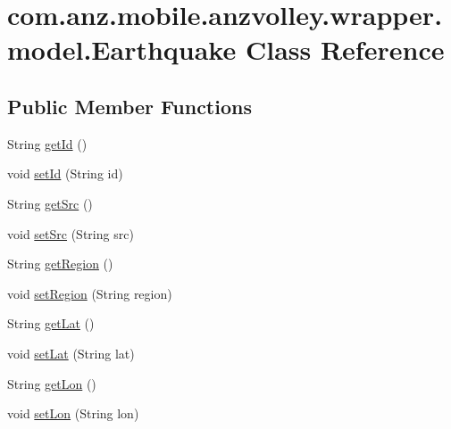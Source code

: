 \hypertarget{classcom_1_1anz_1_1mobile_1_1anzvolley_1_1wrapper_1_1model_1_1_earthquake}{\section{com.\+anz.\+mobile.\+anzvolley.\+wrapper.\+model.\+Earthquake Class Reference}
\label{classcom_1_1anz_1_1mobile_1_1anzvolley_1_1wrapper_1_1model_1_1_earthquake}
}
\subsection*{Public Member Functions}
\begin{DoxyCompactItemize}
\item 
String \hyperlink{classcom_1_1anz_1_1mobile_1_1anzvolley_1_1wrapper_1_1model_1_1_earthquake_a2e4d5762b4fcac4e0c1945888982351a}{get\+Id} ()
\item 
void \hyperlink{classcom_1_1anz_1_1mobile_1_1anzvolley_1_1wrapper_1_1model_1_1_earthquake_a0173d1f987db8e96e624944ee76c11d2}{set\+Id} (String id)
\item 
String \hyperlink{classcom_1_1anz_1_1mobile_1_1anzvolley_1_1wrapper_1_1model_1_1_earthquake_a0c26f0aff05cbf3cff20df12f36b41de}{get\+Src} ()
\item 
void \hyperlink{classcom_1_1anz_1_1mobile_1_1anzvolley_1_1wrapper_1_1model_1_1_earthquake_af5fdf187762e88241ad24a1d74c346c3}{set\+Src} (String src)
\item 
String \hyperlink{classcom_1_1anz_1_1mobile_1_1anzvolley_1_1wrapper_1_1model_1_1_earthquake_ae5996d2d68a066a085799f7d8c313bc0}{get\+Region} ()
\item 
void \hyperlink{classcom_1_1anz_1_1mobile_1_1anzvolley_1_1wrapper_1_1model_1_1_earthquake_a27897eb8ea61cfc4632ff3688fa2c09e}{set\+Region} (String region)
\item 
String \hyperlink{classcom_1_1anz_1_1mobile_1_1anzvolley_1_1wrapper_1_1model_1_1_earthquake_a4299268670e61659e546e8a0fa03abc9}{get\+Lat} ()
\item 
void \hyperlink{classcom_1_1anz_1_1mobile_1_1anzvolley_1_1wrapper_1_1model_1_1_earthquake_a0f9e775fe468e4bd24abdb79bf5679d4}{set\+Lat} (String lat)
\item 
String \hyperlink{classcom_1_1anz_1_1mobile_1_1anzvolley_1_1wrapper_1_1model_1_1_earthquake_a21648731ee91f6728bfc3a8dff86d223}{get\+Lon} ()
\item 
void \hyperlink{classcom_1_1anz_1_1mobile_1_1anzvolley_1_1wrapper_1_1model_1_1_earthquake_aec0b9a64683b630e350928b3630dc78c}{set\+Lon} (String lon)

\end{DoxyCompactItemize}
